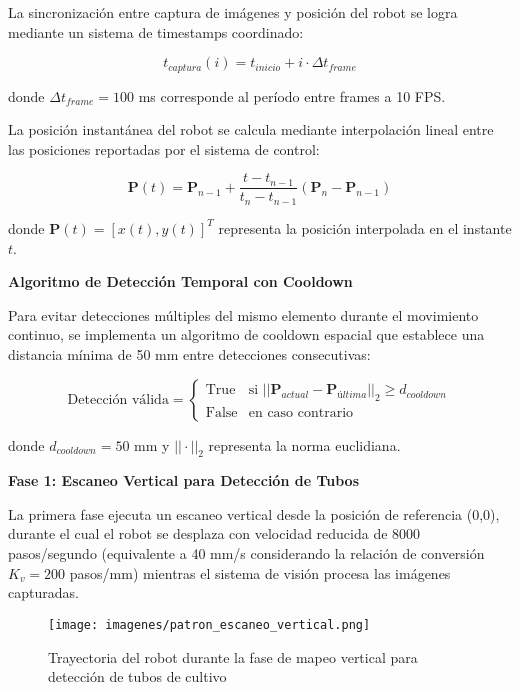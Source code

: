 La sincronización entre captura de imágenes y posición del robot se logra mediante un sistema de timestamps coordinado:

\begin{equation}
t_{captura}(i) = t_{inicio} + i \cdot \Delta t_{frame}
\end{equation}

donde $\Delta t_{frame} = 100$ ms corresponde al período entre frames a 10 FPS.

La posición instantánea del robot se calcula mediante interpolación lineal entre las posiciones reportadas por el sistema de control:

\begin{equation}
\mathbf{P}(t) = \mathbf{P}_{n-1} + \frac{t - t_{n-1}}{t_n - t_{n-1}}(\mathbf{P}_n - \mathbf{P}_{n-1})
\end{equation}

donde $\mathbf{P}(t) = [x(t), y(t)]^T$ representa la posición interpolada en el instante $t$.

\textbf{Algoritmo de Detección Temporal con Cooldown}

Para evitar detecciones múltiples del mismo elemento durante el movimiento continuo, se implementa un algoritmo de cooldown espacial que establece una distancia mínima de 50 mm entre detecciones consecutivas:

\begin{equation}
\text{Detección válida} = \begin{cases}
\text{True} & \text{si } ||\mathbf{P}_{actual} - \mathbf{P}_{última}||_2 \geq d_{cooldown} \\
\text{False} & \text{en caso contrario}
\end{cases}
\end{equation}

donde $d_{cooldown} = 50$ mm y $||\cdot||_2$ representa la norma euclidiana.

\textbf{Fase 1: Escaneo Vertical para Detección de Tubos}

La primera fase ejecuta un escaneo vertical desde la posición de referencia (0,0), durante el cual el robot se desplaza con velocidad reducida de 8000 pasos/segundo (equivalente a 40 mm/s considerando la relación de conversión $K_v = 200$ pasos/mm) mientras el sistema de visión procesa las imágenes capturadas.

\begin{figure}[h]
\centering
\texttt{[image: imagenes/patron\_escaneo\_vertical.png]}
\caption{Trayectoria del robot durante la fase de mapeo vertical para detección de tubos de cultivo}
\label{fig:patron_escaneo_vertical}
\end{figure}

